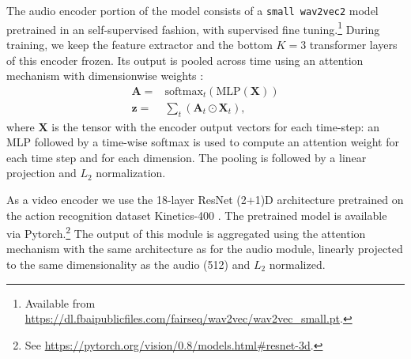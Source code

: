 The audio encoder portion of the model consists of a {\tt small
  wav2vec2} model \citep{wav2vec2} pretrained in an self-supervised
fashion, with supervised fine tuning.\footnote{Available from
  \url{https://dl.fbaipublicfiles.com/fairseq/wav2vec/wav2vec_small.pt}.}
During training, we keep the feature extractor and the bottom $K=3$
transformer layers of this encoder frozen. Its output is pooled across
time using an attention mechanism with dimensionwise weights
\citep{Merkx2019}:
\begin{equation}
  \begin{aligned}
    \mathbf{A} = & \mathrm{softmax}_t\left(\mathrm{MLP}(\mathbf{X})\right)\\
    \mathbf{z} = & \sum_t \left( \mathbf{A}_{t} \odot \mathbf{X}_{t} \right),
  \end{aligned}
  \label{eq:att-pool}
\end{equation}
where $\mathbf{X}$ is the tensor with the encoder output vectors for
each time-step: an MLP followed by a time-wise
softmax is used to compute an attention weight for each time step and for each
dimension.
The pooling is followed by a linear projection and $L_2$
normalization.

As a video encoder we use the 18-layer ResNet (2+1)D architecture
\citep{tran2018closer} pretrained on the action recognition dataset
Kinetics-400 \citep{DBLP:journals/corr/KayCSZHVVGBNSZ17}. The
pretrained model is available via Pytorch.\footnote{See
  \url{https://pytorch.org/vision/0.8/models.html\#resnet-3d}.}  The
output of this module is aggregated using the attention mechanism with
the same architecture as for the audio module, linearly projected to
the same dimensionality as the audio (512) and $L_2$ normalized.
